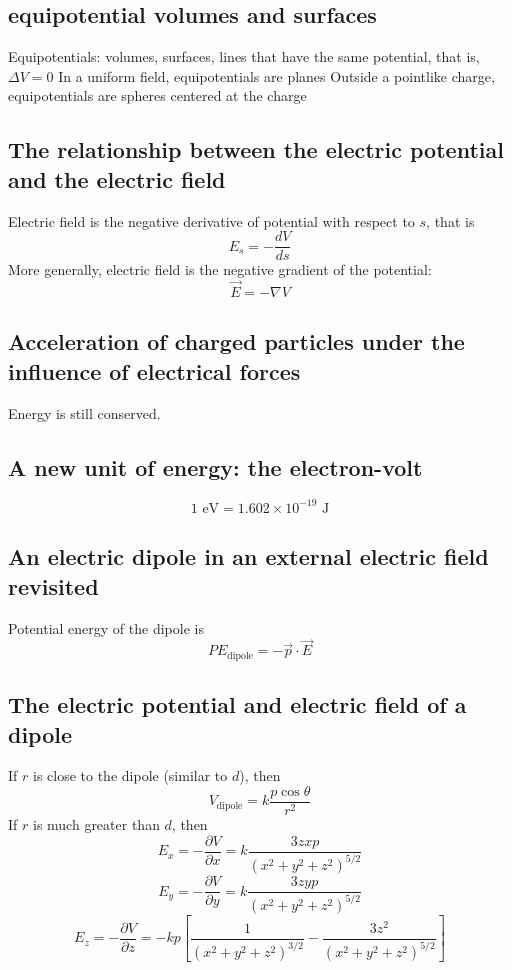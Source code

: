 \documentclass[twocolumn]{article}
\begin{document}
\subsection{equipotential volumes and surfaces}
\begin{outline}
	\1 Equipotentials: volumes, surfaces, lines that have the same potential, that is, \(\Delta V=0\)
	\2 In a uniform field, equipotentials are planes
	\2 Outside a pointlike charge, equipotentials are spheres centered at the charge 
\end{outline}
\subsection{The relationship between the electric potential and the electric field}
\begin{outline}
	\1 Electric field is the negative derivative of potential with respect to $s$, that is \[E_s=-\dfrac{dV}{ds}\]
	\1 More generally, electric field is the negative gradient of the potential: \[\vec{E}=-\nabla V\]
\end{outline}
\subsection{Acceleration of charged particles under the influence of electrical forces}
\begin{outline}
	\1 Energy is still conserved. 
	
\end{outline}
\subsection{A new unit of energy: the electron-volt}
\begin{outline}
	\0 \[1\text{ eV}=1.602\times10^{-19}\text{ J}\]
\end{outline}
\subsection{An electric dipole in an external electric field revisited}
\begin{outline}
	\1 Potential energy of the dipole is \[PE_{\text{dipole}}=-\vec{p}\cdot\vec{E}\]
\end{outline}
\subsection{The electric potential and electric field of a dipole}
\begin{outline}
	\1 If $r$ is close to the dipole (similar to $d$), then \[V_{\text{dipole}}=k\dfrac{p\cos\theta}{r^2}\]
	\1 If $r$ is much greater than $d$, then \[E_x=-\dfrac{\partial V}{\partial x}=k\dfrac{3zxp}{(x^2+y^2+z^2)^{5/2}}\] \[E_y=-\dfrac{\partial V}{\partial y}=k\dfrac{3zyp}{(x^2+y^2+z^2)^{5/2}}\] \[E_z=-\dfrac{\partial V}{\partial z}=-kp\left[\dfrac{1}{(x^2+y^2+z^2)^{3/2}}-\dfrac{3z^2}{(x^2+y^2+z^2)^{5/2}}\right]\]
\end{outline}
\end{document}
